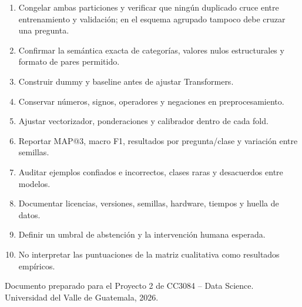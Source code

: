 \documentclass[11pt,oneside,openany]{book}
\begin{document}
\begin{enumerate}
  \item Congelar ambas particiones y verificar que ningún duplicado cruce entre
  entrenamiento y validación; en el esquema agrupado tampoco debe cruzar una
  pregunta.
  \item Confirmar la semántica exacta de categorías, valores nulos estructurales y
  formato de pares permitido.
  \item Construir dummy y baseline antes de ajustar Transformers.
  \item Conservar números, signos, operadores y negaciones en preprocesamiento.
  \item Ajustar vectorizador, ponderaciones y calibrador dentro de cada fold.
  \item Reportar MAP@3, macro F1, resultados por pregunta/clase y variación entre
  semillas.
  \item Auditar ejemplos confiados e incorrectos, clases raras y desacuerdos entre
  modelos.
  \item Documentar licencias, versiones, semillas, hardware, tiempos y huella de
  datos.
  \item Definir un umbral de abstención y la intervención humana esperada.
  \item No interpretar las puntuaciones de la matriz cualitativa como resultados
  empíricos.
\end{enumerate}

\vfill
\begin{center}
\color{GrisTexto}\sffamily\small
Documento preparado para el Proyecto 2 de CC3084 -- Data Science.\\
Universidad del Valle de Guatemala, 2026.
\end{center}
\end{document}
